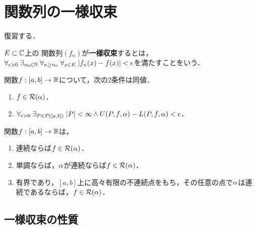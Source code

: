 \documentclass[uplatex, dvipdfmx]{jsreport}
\begin{document}
\section{関数列の一様収束}

\begin{tcolorbox}[colframe=ForestGreen, colback=ForestGreen!10!white,breakable,colbacktitle=ForestGreen!40!white,coltitle=black,fonttitle=\bfseries\sffamily,
title=]
    復習する．
\end{tcolorbox}

\begin{definition}
    $E\subset\mathbb{C}$上の
    関数列$(f_n)$が\textbf{一様収束}するとは，$\forall_{\epsilon>0}\;\exists_{n_0\in\mathbb{N}}\;\forall_{n\ge n_0}\;\forall_{x\in E}\;\lvert f_n(x)-f(x)\rvert<\epsilon$を満たすことをいう．
\end{definition}

\begin{theorem}[可積分性の特徴付け]
    関数$f:[a,b]\to\mathbb{R}$について，次の2条件は同値．
    \begin{enumerate}
        \item $f\in\mathcal{R}(\alpha)$．
        \item $\forall_{\epsilon>0}\;\exists_{P\in P([a,b])}\;\lvert P\rvert<\infty\land U(P,f,\alpha)-L(P,f,\alpha)<\epsilon$．
    \end{enumerate}
\end{theorem}

\begin{theorem}[可積分条件]\mbox{}
    関数$f:[a,b]\to\mathbb{R}$は，
    \begin{enumerate}
        \item 連続ならば$f\in\mathcal{R}(\alpha)$．
        \item 単調ならば，$\alpha$が連続ならば$f\in\mathcal{R}(\alpha)$．
        \item 有界であり，$[a,b]$上に高々有限の不連続点をもち，その任意の点で$\alpha$は連続であるならば，$f\in\mathcal{R}(\alpha)$．
    \end{enumerate}
\end{theorem}



\subsection{一様収束の性質}
\end{document}
